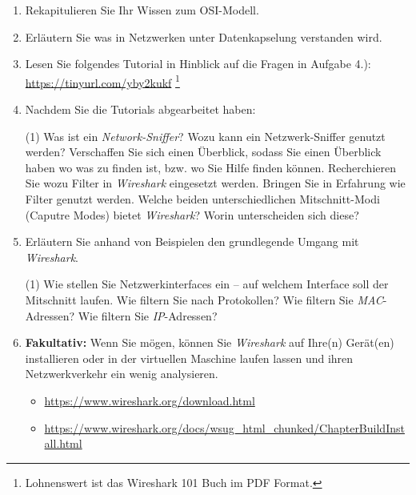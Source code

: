 \documentclass[paper=a4,fontsize=11pt]{scrartcl}%
\numberwithin{equation}{section}
\begin{document}
\begin{enumerate}
	\item Rekapitulieren Sie Ihr Wissen zum OSI-Modell. 
	\item Erläutern Sie was in Netzwerken unter Datenkapselung verstanden wird.	
	\item Lesen Sie folgendes Tutorial in Hinblick auf die Fragen in Aufgabe 4.): \url{https://tinyurl.com/yby2kukf}
	\footnote{Lohnenswert ist das Wireshark 101 Buch im PDF Format.}
	\item Nachdem Sie die Tutorials abgearbeitet haben:
	\begin{tasks}(1)
		\task Was ist ein \emph{Network-Sniffer}?
		\task Wozu kann ein Netzwerk-Sniffer genutzt werden?
		\task Verschaffen Sie sich einen Überblick, sodass Sie einen Überblick haben wo was zu finden ist, bzw. wo Sie Hilfe finden können.
		\task Recherchieren Sie wozu Filter in \emph{Wireshark} eingesetzt werden.
		\task Bringen Sie in Erfahrung wie Filter genutzt werden.
		\task Welche beiden unterschiedlichen Mitschnitt-Modi (Caputre Modes) bietet \emph{Wireshark}? Worin unterscheiden sich diese?
	\end{tasks}
	\item Erläutern Sie anhand von Beispielen den grundlegende Umgang mit \emph{Wireshark}. 
	\begin{tasks}(1)
		\task Wie stellen Sie Netzwerkinterfaces ein -- auf welchem Interface soll der Mitschnitt laufen.
		\task Wie filtern Sie nach Protokollen?
		\task Wie filtern Sie \emph{MAC}-Adressen?
		\task Wie filtern Sie \emph{IP}-Adressen?
	\end{tasks}
	\item \textbf{Fakultativ:} Wenn Sie mögen, können Sie \emph{Wireshark} auf Ihre(n) Gerät(en) installieren oder in der virtuellen Maschine laufen lassen und ihren Netzwerkverkehr ein wenig analysieren. 
	\begin{itemize}
		\item \url{https://www.wireshark.org/download.html}
		\item \url{https://www.wireshark.org/docs/wsug_html_chunked/ChapterBuildInstall.html}
	\end{itemize}
\end{enumerate}
\end{document}
